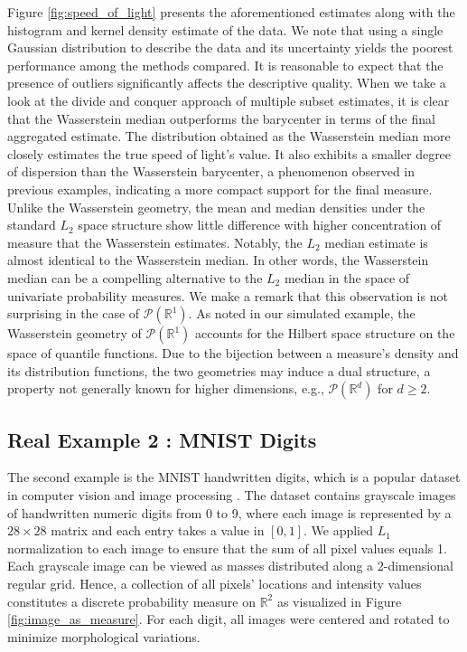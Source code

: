 \documentclass[11pt]{article}
\newcommand{\calP}{\mathcal{P}}
\newcommand{\bbR}{\mathbb{R}}
\begin{document}
Figure \ref{fig:speed_of_light} presents the aforementioned estimates along with the histogram and kernel density estimate of the data. We note that using a single Gaussian distribution to describe the data and its uncertainty yields the poorest performance among the methods compared.  It is reasonable to expect that the presence of outliers significantly affects the descriptive quality. When we take a look at the divide and conquer approach of multiple subset estimates, it is clear that the Wasserstein median outperforms the barycenter in terms of the final aggregated estimate. The distribution obtained as the Wasserstein median more closely estimates the true speed of light's value. It also exhibits a smaller degree of dispersion than the Wasserstein barycenter, a phenomenon observed in previous examples, indicating a more compact support for the final measure. Unlike the Wasserstein geometry, the mean and median  densities under the standard $L_2$ space structure show little difference with higher concentration of measure that the Wasserstein estimates. Notably, the $L_2$ median estimate is almost identical to the Wasserstein median. In other words, the Wasserstein median can be a compelling alternative to the $L_2$ median in the space of univariate probability measures. We make a remark that this observation is not surprising in the case of $\calP(\bbR^1)$. As noted in our simulated example, the Wasserstein geometry of $\calP(\bbR^1)$ accounts for the Hilbert space structure on the space of quantile functions. Due to the bijection between a measure's density and its distribution functions, the two geometries may induce a dual structure, a property not generally known for higher dimensions, e.g., $\calP(\bbR^d)$ for $d\geq 2$.



\subsection{Real Example 2 : MNIST Digits}

The second example is the MNIST handwritten digits, which is a popular dataset in computer vision and image processing \citep{lecun_1998_MNISTDatabaseHandwritten}. The dataset contains grayscale images of handwritten numeric digits from 0 to 9, where each image is represented by a $28\times 28$ matrix and each entry takes a value in $[0,1]$. We applied $L_1$ normalization to each image to ensure that the sum of all pixel values equals 1. Each grayscale image can be viewed as masses distributed along a 2-dimensional regular grid. Hence, a collection of all pixels' locations and intensity values constitutes a discrete probability measure on $\mathbb{R}^2$ as visualized in Figure \ref{fig:image_as_measure}. For each digit, all images were centered and rotated to minimize morphological variations.
\end{document}

